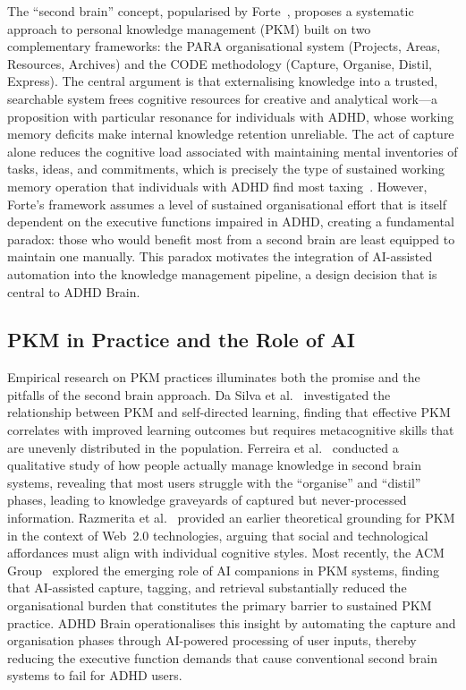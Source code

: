 The ``second brain'' concept, popularised by Forte~\cite{forte2022}, proposes a systematic approach to personal knowledge management (PKM) built on two complementary frameworks: the PARA organisational system (Projects, Areas, Resources, Archives) and the CODE methodology (Capture, Organise, Distil, Express). The central argument is that externalising knowledge into a trusted, searchable system frees cognitive resources for creative and analytical work---a proposition with particular resonance for individuals with ADHD, whose working memory deficits make internal knowledge retention unreliable. The act of capture alone reduces the cognitive load associated with maintaining mental inventories of tasks, ideas, and commitments, which is precisely the type of sustained working memory operation that individuals with ADHD find most taxing~\cite{diamond2013}. However, Forte's framework assumes a level of sustained organisational effort that is itself dependent on the executive functions impaired in ADHD, creating a fundamental paradox: those who would benefit most from a second brain are least equipped to maintain one manually. This paradox motivates the integration of AI-assisted automation into the knowledge management pipeline, a design decision that is central to ADHD Brain.

\subsection{PKM in Practice and the Role of AI}
\label{sec:litrev_pkm_ai}

Empirical research on PKM practices illuminates both the promise and the pitfalls of the second brain approach. Da Silva et al.~\cite{dasilva2024} investigated the relationship between PKM and self-directed learning, finding that effective PKM correlates with improved learning outcomes but requires metacognitive skills that are unevenly distributed in the population. Ferreira et al.~\cite{ferreira2025} conducted a qualitative study of how people actually manage knowledge in second brain systems, revealing that most users struggle with the ``organise'' and ``distil'' phases, leading to knowledge graveyards of captured but never-processed information. Razmerita et al.~\cite{razmerita2009} provided an earlier theoretical grounding for PKM in the context of Web~2.0 technologies, arguing that social and technological affordances must align with individual cognitive styles. Most recently, the ACM Group~\cite{acmgroup2025} explored the emerging role of AI companions in PKM systems, finding that AI-assisted capture, tagging, and retrieval substantially reduced the organisational burden that constitutes the primary barrier to sustained PKM practice. ADHD Brain operationalises this insight by automating the capture and organisation phases through AI-powered processing of user inputs, thereby reducing the executive function demands that cause conventional second brain systems to fail for ADHD users.

